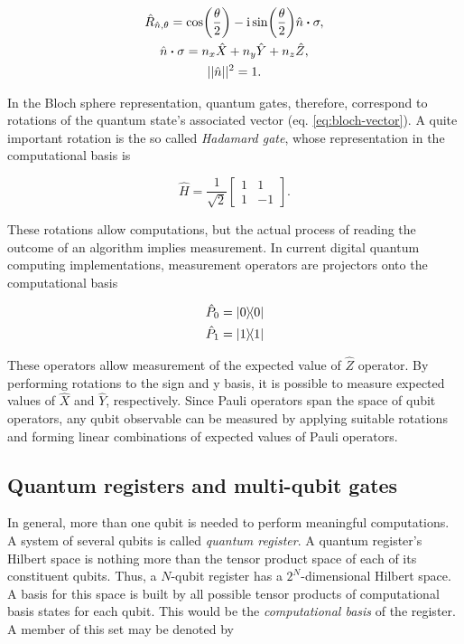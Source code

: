   \begin{gather}
    \hat{R}_{\hat{n}, \theta} = \cos(\frac{\theta}{2}) - \mathrm{i}\sin(\frac{\theta}{2}) \hat{n} \vdot \sigma, \\
    \hat{n} \vdot \sigma = n_x \hat{X} + n_y \hat{Y} + n_z \hat{Z}, \\
    ||\hat{n}||^2 = 1.
  \end{gather}

  In the Bloch sphere representation, quantum gates, therefore, correspond to rotations of the quantum state's associated vector (eq. \ref{eq:bloch-vector}). A quite important rotation is the so called \textit{Hadamard gate}, whose representation in the computational basis is
  
  \begin{equation}
    \hat{H} = \frac{1}{\sqrt{2}}\begin{bmatrix}
      1 & 1 \\
      1 & -1
    \end{bmatrix}.
    \label{eq:hadamard-gate}
  \end{equation}
  
  
  These rotations allow computations, but the actual process of reading the outcome of an algorithm implies measurement. In current digital quantum computing implementations, measurement operators are projectors onto the computational basis

  \begin{gather}
    \hat{P}_0 = \ketbra{0}{0} \\
    \hat{P}_1 = \ketbra{1}{1} 
    \label{eq:measurement-ops}
  \end{gather}

  These operators allow measurement of the expected value of $\hat{Z}$ operator. By performing rotations to the sign and y basis, it is possible to measure expected values of $\hat{X}$ and $\hat{Y}$, respectively. Since Pauli operators span the space of qubit operators, any qubit observable can be measured by applying suitable rotations and forming linear combinations of expected values of Pauli operators.

  \subsection{Quantum registers and multi-qubit gates}
  \label{subsec:MultiQubit}

    In general, more than one qubit is needed to perform meaningful computations. A system of several qubits is called \textit{quantum register}. A quantum register's Hilbert space is nothing more than the tensor product space of each of its constituent qubits. Thus, a $N$-qubit register has a $2^N$-dimensional Hilbert space. A basis for this space is built by all possible tensor products of computational basis states for each qubit. This would be the \textit{computational basis} of the register. A member of this set may be denoted by

